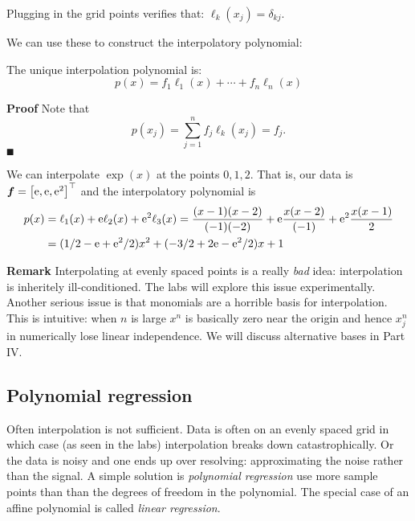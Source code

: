 Plugging in the grid points verifies that: $\ensuremath{\ell}_k(x_j) = \ensuremath{\delta}_{kj}$.

We can use these to construct the interpolatory polynomial:

\begin{theorem} The unique interpolation polynomial is:
\[
p(x) = f_1 \ensuremath{\ell}_1(x) + \ensuremath{\cdots} + f_n \ensuremath{\ell}_n(x)
\]
\end{theorem}
\textbf{Proof} Note that
\[
p(x_j) = \ensuremath{\sum}_{j=1}^n f_j \ensuremath{\ell}_k(x_j) = f_j.
\]
\ensuremath{\QED}

\begin{example} We can interpolate $\exp(x)$ at the points $0,1,2$. That is, our data is $\ensuremath{\bm{\f}} = \vectt[{\rm e}, {\rm e},{\rm e}^2]$ and the interpolatory polynomial is
\begin{align*}
p(x) &= \ensuremath{\ell}_1(x) + {\rm e} \ensuremath{\ell}_2(x) + {\rm e}^2 \ensuremath{\ell}_3(x) =
{(x - 1) (x-2) \over (-1)(-2)} + {\rm e} {x (x-2) \over (-1)} +
{\rm e}^2 {x (x-1) \over 2} \\
&= (1/2 - {\rm e} +{\rm e}^2/2)x^2 + (-3/2 + 2 {\rm e}  - {\rm e}^2 /2) x + 1
\end{align*}
\end{example}

\textbf{Remark} Interpolating at evenly spaced points is a really \emph{bad} idea: interpolation is inheritely ill-conditioned. The labs will explore this issue experimentally. Another serious issue is that monomials are a horrible basis for interpolation. This is intuitive: when $n$ is large $x^n$ is basically zero near the origin and hence $x_j^n$ in numerically lose linear independence. We will discuss alternative bases in Part IV.

\subsection{Polynomial regression}
Often interpolation is not sufficient. Data is often on an evenly spaced grid in which case (as seen in the labs) interpolation breaks down catastrophically. Or the data is noisy and one ends up over resolving: approximating the noise rather than the signal. A simple solution is \emph{polynomial regression} use more sample points than than the degrees of freedom in the polynomial. The special case of an affine polynomial is called \emph{linear regression}.

